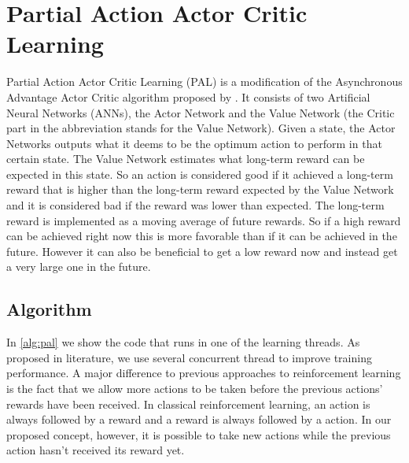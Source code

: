 \documentclass[sigconf]{acmart}
\begin{document}




\maketitle

\section{Partial Action Actor Critic Learning}
\label{sec:pal}

Partial Action Actor Critic Learning (PAL) is a modification of the Asynchronous Advantage Actor Critic algorithm proposed by \citet{mnih_asynchronous_2016}. It consists of two Artificial Neural Networks (ANNs), the Actor Network and the Value Network (the Critic part in the abbreviation stands for the Value Network). Given a state, the Actor Networks outputs what it deems to be the optimum action to perform in that certain state. The Value Network estimates what long-term reward can be expected in this state. So an action is considered good if it achieved a long-term reward that is higher than the long-term reward expected by the Value Network and it is considered bad if the reward was lower than expected. The long-term reward is implemented as a moving average of future rewards. So if a high reward can be achieved right now this is more favorable than if it can be achieved in the future. However it can also be beneficial to get a low reward now and instead get a very large one in the future. 

\subsection{Algorithm}
\label{subsec:alg}

In \autoref{alg:pal} we show the code that runs in one of the learning threads. As proposed in literature, we use several concurrent thread to improve training performance. A major difference to previous approaches to reinforcement learning is the fact that we allow more actions to be taken before the previous actions' rewards have been received. In classical reinforcement learning, an action is always followed by a reward and a reward is always followed by a action. In our proposed concept, however, it is possible to take new actions while the previous action hasn't received its reward yet.
\end{document}
